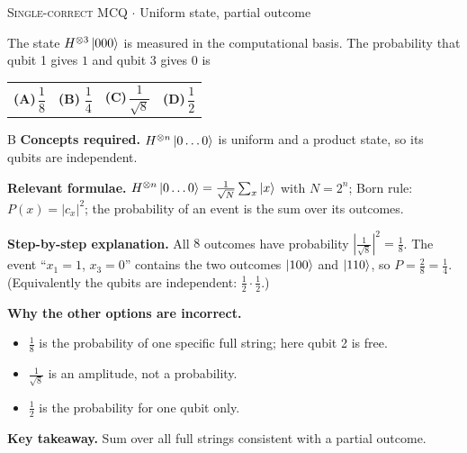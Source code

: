 \documentclass[11pt,a4paper]{article}
\newcommand{\optlabel}[1]{\textbf{(#1)}}
\newcommand{\correctlabel}[1]{\textcolor{okgreen}{\textbf{(#1)}\,\ding{51}}}
\newenvironment{qitem}[1]{\begin{list}{}{\setlength{\leftmargin}{3.3em}\setlength{\labelwidth}{3.1em}%
  \setlength{\labelsep}{0.2em}\setlength{\topsep}{3pt}\setlength{\parsep}{3pt}}\item[\textbf{Q.#1}\hfill]}{\end{list}}
\newcommand{\qsep}{\par\vspace{2pt}{\color{black!15}\hrule}\vspace{4pt}}
\newcommand{\qmeta}[2]{{\footnotesize\color{black!60}\textsc{#1} \;$\cdot$\; #2}\par}
\begin{document}
\begin{qitem}{21}
\qmeta{Single-correct MCQ}{Uniform state, partial outcome}
The state $H^{\otimes3}\ket{000}$ is measured in the computational basis. The probability that qubit 1 gives $1$ and qubit 3 gives $0$ is
\par\smallskip\noindent\begin{tabularx}{\linewidth}{@{}*{4}{L}@{}}
\optlabel{A}\,$\dfrac18$ & \correctlabel{B}\,$\dfrac14$ & \optlabel{C}\,$\dfrac{1}{\sqrt8}$ & \optlabel{D}\,$\dfrac12$
\end{tabularx}
\end{qitem}
\begin{solbox}{B}
\textbf{\color{brand}Concepts required.} $H^{\otimes n}\ket{0\dots0}$ is uniform and a product state, so its qubits are independent.

\textbf{\color{brand}Relevant formulae.} $H^{\otimes n}\ket{0\dots0} = \frac{1}{\sqrt N}\sum_x\ket{x}$ with $N = 2^n$; Born rule: $P(x) = |c_x|^2$; the probability of an event is the sum over its outcomes.

\textbf{\color{brand}Step-by-step explanation.} All $8$ outcomes have probability $\left|\frac{1}{\sqrt8}\right|^2 = \frac18$. The event ``$x_1 = 1$, $x_3 = 0$'' contains the two outcomes
$\ket{100}$ and $\ket{110}$, so $P = \frac28 = \frac14$. (Equivalently the qubits are independent: $\frac12\cdot\frac12$.)

\textbf{\color{brand}Why the other options are incorrect.}
\begin{itemize}[leftmargin=2.4em, itemsep=1pt, topsep=2pt]
\item[\textbf{(A)}] $\frac18$ is the probability of one specific full string; here qubit 2 is free.
\item[\textbf{(C)}] $\frac{1}{\sqrt8}$ is an amplitude, not a probability.
\item[\textbf{(D)}] $\frac12$ is the probability for one qubit only.
\end{itemize}
\textbf{\color{brand}Key takeaway.} Sum over all full strings consistent with a partial outcome.
\end{solbox}
\qsep
\end{document}
